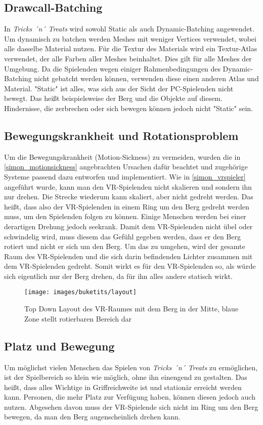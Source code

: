 \subsection{Drawcall-Batching}
In \emph{Tricks ´n´ Treats} wird sowohl Static als auch Dynamic-Batching angewendet. Um dynamisch zu batchen werden Meshes mit weniger Vertices verwendet, wobei alle dasselbe Material nutzen. Für die Textur des Materials wird ein Textur-Atlas verwendet, der alle Farben aller Meshes beinhaltet. Dies gilt für alle Meshes der Umgebung. Da die Spielenden wegen einiger Rahmenbedingungen des Dynamic-Batching nicht gebatcht werden können, verwenden diese einen anderen Atlas und Material. "Static" ist alles, was sich aus der Sicht der PC-Spielenden nicht bewegt. Das heißt beispielsweise der Berg und die Objekte auf diesem. Hindernisse, die zerbrechen oder sich bewegen können jedoch nicht "Static" sein.

\subsection{Bewegungskrankheit und Rotationsproblem}
Um die Bewegungskrankheit (Motion-Sickness) zu vermeiden, wurden die in \ref{simon_motionsickness} angebrachten Ursachen dafür beachtet und zugehörige Systeme passend dazu entworfen und implementiert.
Wie in \ref{simon_vrspieler} angeführt wurde, kann man den VR-Spielenden nicht skalieren und sondern ihn nur drehen. Die Strecke wiederum kann skaliert, aber nicht gedreht werden. Das heißt, dass also der VR-Spielenden in einem Ring um den Berg gedreht werden muss, um den Spielenden folgen zu können. Einige Menschen werden bei einer derartigen Drehung jedoch seekrank. Damit dem VR-Spielenden nicht übel oder schwindelig wird, muss diesem das Gefühl gegeben werden, dass er den Berg rotiert und nicht er sich um den Berg. Um das zu umgehen, wird der gesamte Raum des VR-Spielenden und die sich darin befindenden Lichter zusammen mit dem VR-Spielenden gedreht. Somit wirkt es für den VR-Spielenden so, als würde sich eigentlich nur der Berg drehen, da für ihn alles andere statisch wirkt.

\begin{figure}[h]
	\centering
	\texttt{[image: images/buketits/layout]}
	\caption{Top Down Layout des VR-Raumes mit dem Berg in der Mitte, blaue Zone stellt rotierbaren Bereich dar}
\end{figure}


\subsection{Platz und Bewegung}
Um möglichst vielen Menschen das Spielen von \emph{Tricks ´n´ Treats} zu ermöglichen, ist der Spielbereich so klein wie möglich, ohne ihn einengend zu gestalten. Das heißt, dass alles Wichtige in Griffreichweite ist und stationär erreicht werden kann. Personen, die mehr Platz zur Verfügung haben, können diesen jedoch auch nutzen. Abgesehen davon muss der VR-Spielende sich nicht im Ring um den Berg bewegen, da man den Berg augenscheinlich drehen kann.

